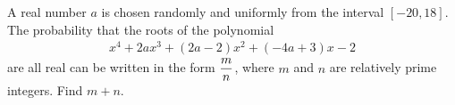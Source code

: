A real number $a$ is chosen randomly and uniformly from the interval $[-20, 18]$. The probability that the roots of the polynomial 
\begin{align*}
x^{4} + 2ax^{3} + (2a-2)x^{2} + (-4a+3)x -2
\end{align*}
are all real can be written in the form $\displaystyle\frac{m}{n}$, where $m$ and $n$ are relatively prime integers. Find $m+n$.